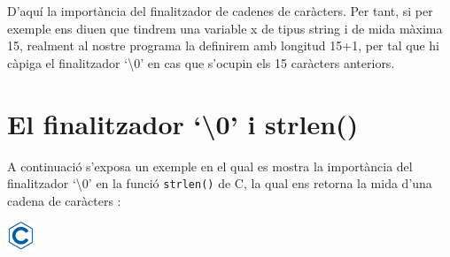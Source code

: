\documentclass[]{book}
\begin{document}
D'aquí la importància del finalitzador de cadenes de caràcters. Per
tant, si per exemple ens diuen que tindrem una variable x de tipus
string i de mida màxima 15, realment al nostre programa la definirem amb
longitud 15+1, per tal que hi càpiga el finalitzador `\textbackslash{}0'
en cas que s'ocupin els 15 caràcters anteriors.

\section{\texorpdfstring{El finalitzador `\textbackslash{}0' i
strlen()}{El finalitzador \textbackslash{}0 i strlen()}}\label{el-finalitzador-0-i-strlen}

A continuació s'exposa un exemple en el qual es mostra la importància
del finalitzador `\textbackslash{}0' en la funció \texttt{strlen()} de
C, la qual ens retorna la mida d'una cadena de caràcters :

\includegraphics{./img/c.png}
\end{document}
